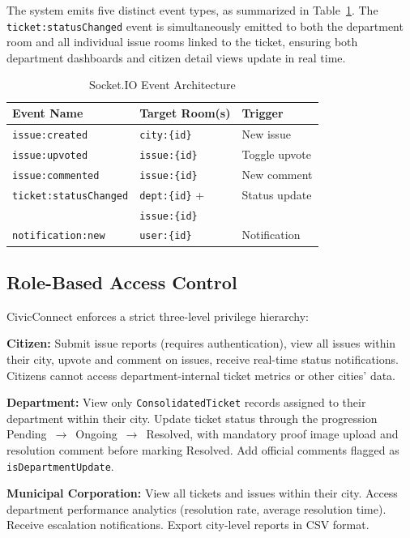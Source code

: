 \documentclass[conference]{IEEEtran}
\begin{document}
The system emits five distinct event types, as summarized in Table~\ref{tab:events}. The \texttt{ticket:statusChanged} event is simultaneously emitted to both the department room and all individual issue rooms linked to the ticket, ensuring both department dashboards and citizen detail views update in real time.

\begin{table}[htbp]
\caption{Socket.IO Event Architecture}
\begin{center}
\begin{tabular}{lll}
\toprule
\textbf{Event Name} & \textbf{Target Room(s)} & \textbf{Trigger} \\
\midrule
\texttt{issue:created} & \texttt{city:\{id\}} & New issue \\
\texttt{issue:upvoted} & \texttt{issue:\{id\}} & Toggle upvote \\
\texttt{issue:commented} & \texttt{issue:\{id\}} & New comment \\
\texttt{ticket:statusChanged} & \texttt{dept:\{id\}} + & Status update \\
 & \texttt{issue:\{id\}} & \\
\texttt{notification:new} & \texttt{user:\{id\}} & Notification \\
\bottomrule
\end{tabular}
\label{tab:events}
\end{center}
\end{table}

\subsection{Role-Based Access Control}

CivicConnect enforces a strict three-level privilege hierarchy:

\textbf{Citizen:} Submit issue reports (requires authentication), view all issues within their city, upvote and comment on issues, receive real-time status notifications. Citizens cannot access department-internal ticket metrics or other cities' data.

\textbf{Department:} View only \texttt{ConsolidatedTicket} records assigned to their department within their city. Update ticket status through the progression Pending~$\rightarrow$~Ongoing~$\rightarrow$~Resolved, with mandatory proof image upload and resolution comment before marking Resolved. Add official comments flagged as \texttt{isDepartmentUpdate}.

\textbf{Municipal Corporation:} View all tickets and issues within their city. Access department performance analytics (resolution rate, average resolution time). Receive escalation notifications. Export city-level reports in CSV format.
\end{document}
